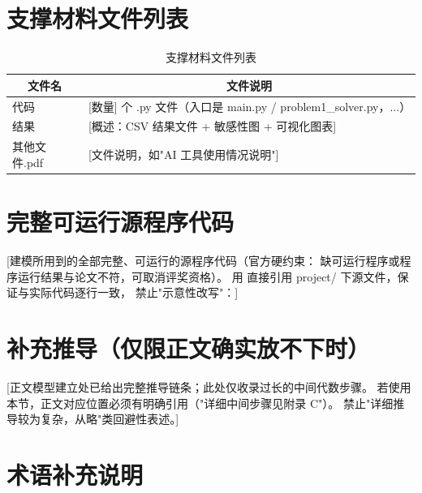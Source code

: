 \documentclass[12pt,a4paper]{ctexart}
\begin{document}
\appendix
\label{appendix:start}

\section{支撑材料文件列表}

\begin{table}[H]
\centering
\caption{支撑材料文件列表}
\begin{tabular}{p{5cm}p{9cm}}
\toprule
\multicolumn{1}{c}{文件名} & \multicolumn{1}{c}{文件说明} \\
\midrule
代码 & [数量] 个 .py 文件（入口是 main.py / problem1\_solver.py，...） \\
结果 & [概述：CSV 结果文件 + 敏感性图 + 可视化图表] \\
{其他文件.pdf} & [文件说明，如"AI 工具使用情况说明"] \\
\bottomrule
\end{tabular}
\end{table}

\section{完整可运行源程序代码}

[建模所用到的全部完整、可运行的源程序代码（官方硬约束：
缺可运行程序或程序运行结果与论文不符，可取消评奖资格）。
用 \VerbatimInput 直接引用 project/ 下源文件，保证与实际代码逐行一致，
禁止"示意性改写"：]


\section{补充推导（仅限正文确实放不下时）}

[正文模型建立处已给出完整推导链条；此处仅收录过长的中间代数步骤。
若使用本节，正文对应位置必须有明确引用（"详细中间步骤见附录 C"）。
禁止"详细推导较为复杂，从略"类回避性表述。]

\section{术语补充说明}

\end{document}
